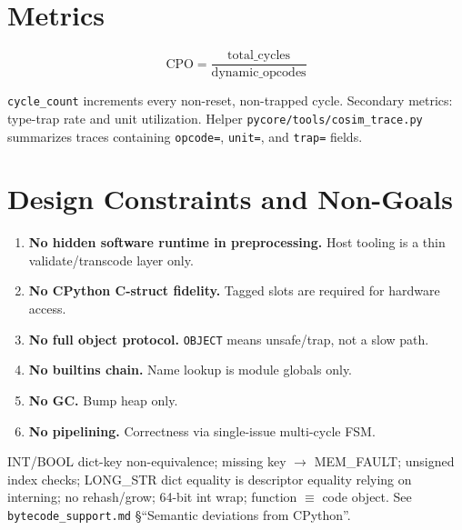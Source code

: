 \documentclass[11pt,a4paper]{article}
\newcommand{\tagname}[1]{\texttt{#1}}
\newcommand{\modname}[1]{\texttt{#1}}
\begin{document}
\section{Metrics}
\label{sec:metrics}

\begin{equation}
  \mathrm{CPO} = \frac{\mathrm{total\_cycles}}{\mathrm{dynamic\_opcodes}}
\end{equation}

\texttt{cycle\_count} increments every non-reset, non-trapped cycle. Secondary
metrics: type-trap rate and unit utilization. Helper
\modname{pycore/tools/cosim\_trace.py} summarizes traces containing
\texttt{opcode=}, \texttt{unit=}, and \texttt{trap=} fields.

\section{Design Constraints and Non-Goals}
\label{sec:nongoals}

\begin{enumerate}[leftmargin=*]
  \item \textbf{No hidden software runtime in preprocessing.} Host tooling is a
        thin validate/transcode layer only.
  \item \textbf{No CPython C-struct fidelity.} Tagged slots are required for
        hardware access.
  \item \textbf{No full object protocol.} \tagname{OBJECT} means unsafe/trap,
        not a slow path.
  \item \textbf{No builtins chain.} Name lookup is module globals only.
  \item \textbf{No GC.} Bump heap only.
  \item \textbf{No pipelining.} Correctness via single-issue multi-cycle FSM.
\end{enumerate}

\begin{warnbox}
INT/BOOL dict-key non-equivalence; missing key $\rightarrow$ MEM\_FAULT;
unsigned index checks; LONG\_STR dict equality is descriptor equality relying
on interning; no rehash/grow; 64-bit int wrap; function $\equiv$ code object.
See \texttt{bytecode\_support.md} §``Semantic deviations from CPython''.
\end{warnbox}

\end{document}
